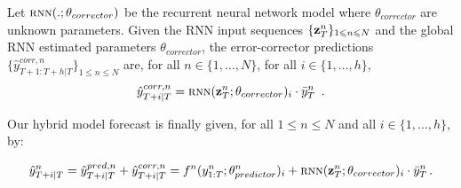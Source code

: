 \documentclass{article} %
\newcommand{\ts}{y}
\newcommand{\tspred}{\hat{\ts}}
\newcommand{\stat}{f}
\newcommand{\statparam}{\theta_{predictor}}
\newcommand{\lag}{h}
\newcommand{\meants}{\Bar{\ts}}
\newcommand{\rnnwindow}{{\bf \rnninput}}
\newcommand{\rnninput}{z}
\newcommand{\rnn}{\textsc{rnn}}
\newcommand{\rnnparam}{\theta_{corrector}}
\newcommand{\err}{err}
\newcommand{\threshold}{\eta}
\newcommand{\predictor}{\mathrm{RNN}_p}
\newcommand{\classifier}{\mathrm{RNN}_c}
\newcommand{\remainder}{r}
\newcommand{\hiddenregime}{U}
\begin{document}
Let $\rnn(.;\rnnparam)$ be the recurrent neural network model where $\rnnparam$ are  unknown parameters. Given the RNN input sequences $\{\rnnwindow^n_T\}_{1\leqslant n \leqslant N}$ and the global RNN estimated parameters $\rnnparam$, the error-corrector predictions $\{\tspred^{corr,n}_{T+1:T+\lag|T}\}_{1\leqslant n \leqslant N}$ are, for all $n \in \{1,\ldots,N\}$, for all $i \in \{1,\ldots,\lag\}$,
$$
\tspred^{corr,n}_{T+i|T} = \rnn(\rnnwindow^n_T;\rnnparam)_i \cdot \meants^n_T\ \,.
$$

Our hybrid model forecast is finally given, for all $1\leqslant n \leqslant N$ and all $i \in \{1,\ldots,\lag\}$, by:

\begin{equation}
\label{eq:nows:full:model}
\tspred^n_{T+i|T}  = \tspred^{pred,n}_{T+i|T} +  \tspred^{corr,n}_{T+i|T} = \stat^n(\ts^n_{1:T};\statparam^n)_i +  \rnn(\rnnwindow^n_T;\rnnparam)_i \cdot \meants^n_T\,.
\end{equation}







\end{document}
